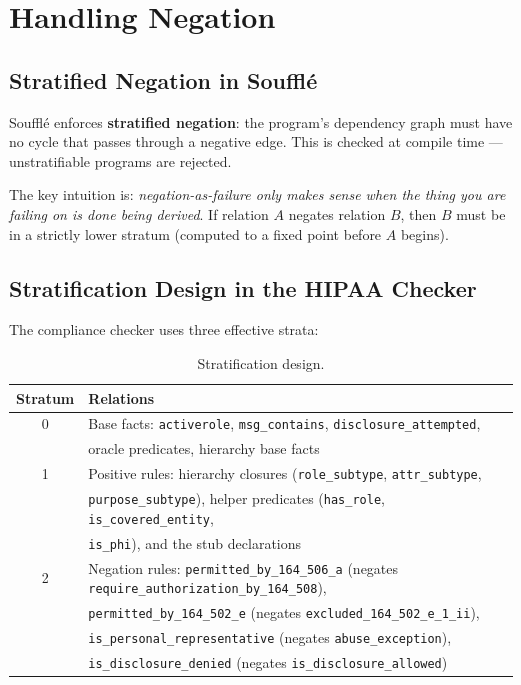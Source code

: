 \documentclass[11pt,letterpaper]{article}
\begin{document}
\section{Handling Negation}
\label{sec:negation}

\subsection{Stratified Negation in Souffl\'{e}}

Souffl\'{e} enforces \textbf{stratified negation}: the program's dependency graph must have no cycle that passes through a negative edge. This is checked at compile time --- unstratifiable programs are rejected.

The key intuition is: \emph{negation-as-failure only makes sense when the thing you are failing on is done being derived}. If relation $A$ negates relation $B$, then $B$ must be in a strictly lower stratum (computed to a fixed point before $A$ begins).

\subsection{Stratification Design in the HIPAA Checker}

The compliance checker uses three effective strata:

\begin{table}[H]
\centering
\begin{tabular}{cl}
\toprule
\textbf{Stratum} & \textbf{Relations} \\
\midrule
0 & Base facts: \texttt{activerole}, \texttt{msg\_contains}, \texttt{disclosure\_attempted}, \\
  & oracle predicates, hierarchy base facts \\
1 & Positive rules: hierarchy closures (\texttt{role\_subtype}, \texttt{attr\_subtype}, \\
  & \texttt{purpose\_subtype}), helper predicates (\texttt{has\_role}, \texttt{is\_covered\_entity}, \\
  & \texttt{is\_phi}), and the stub declarations \\
2 & Negation rules: \texttt{permitted\_by\_164\_506\_a} (negates \texttt{require\_authorization\_by\_164\_508}), \\
  & \texttt{permitted\_by\_164\_502\_e} (negates \texttt{excluded\_164\_502\_e\_1\_ii}), \\
  & \texttt{is\_personal\_representative} (negates \texttt{abuse\_exception}), \\
  & \texttt{is\_disclosure\_denied} (negates \texttt{is\_disclosure\_allowed}) \\
\bottomrule
\end{tabular}
\caption{Stratification design.}
\end{table}
\end{document}

